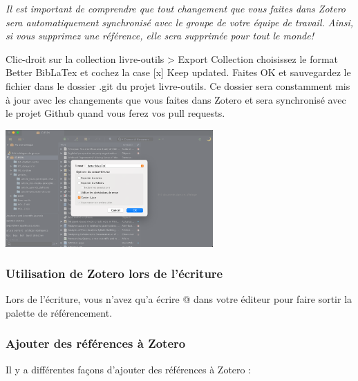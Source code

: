 \documentclass[
  letterpaper,
]{scrbook}
\begin{document}
\emph{Il est important de comprendre que tout changement que vous faites
dans Zotero sera automatiquement synchronisé avec le groupe de votre
équipe de travail. Ainsi, si vous supprimez une référence, elle sera
supprimée pour tout le monde!}

Clic-droit sur la collection livre-outils \textgreater{} Export
Collection choisissez le format Better BibLaTex et cochez la case
{[}x{]} Keep updated. Faites OK et sauvegardez le fichier dans le
dossier .git du projet livre-outils. Ce dossier sera constamment mis à
jour avec les changements que vous faites dans Zotero et sera
synchronisé avec le projet Github quand vous ferez vos pull requests.

\includegraphics[width=3.125in,height=\textheight]{images/chapitre6_biblatex.png}

\hypertarget{utilisation-de-zotero-lors-de-luxe9criture}{%
\subsubsection{Utilisation de Zotero lors de
l'écriture}\label{utilisation-de-zotero-lors-de-luxe9criture}}

Lors de l'écriture, vous n'avez qu'a écrire @ dans votre éditeur pour
faire sortir la palette de référencement.

\hypertarget{ajouter-des-ruxe9fuxe9rences-uxe0-zotero}{%
\subsubsection{Ajouter des références à
Zotero}\label{ajouter-des-ruxe9fuxe9rences-uxe0-zotero}}

Il y a différentes façons d'ajouter des références à Zotero :
\end{document}
